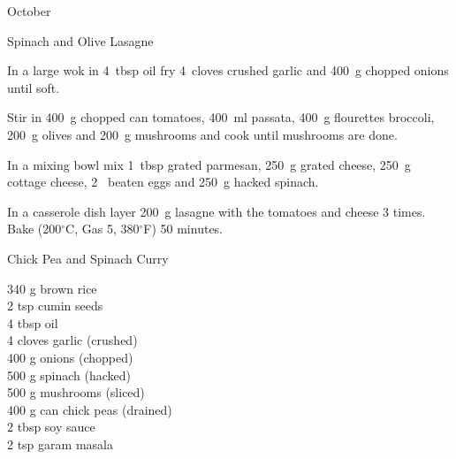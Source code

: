 \begin{menu}{October}
\begin{recipe}{2}{Spinach and Olive Lasagne}
	
	
    \begin{instructions}
    \item 
        In a large wok in
        4~tbsp  oil
        fry
        4~cloves crushed garlic
        and
        400~g chopped onions
        until soft.
      \item 
        Stir in
        400~g chopped can tomatoes,
        400~ml  passata,
        400~g flourettes broccoli,
        200~g  olives
        and
        200~g  mushrooms
        and cook until mushrooms are done.
      \item 
        In a mixing bowl mix
        1~tbsp grated parmesan,
        250~g grated cheese,
        250~g  cottage cheese,
        2~ beaten eggs
        and
        250~g hacked spinach.
      \item 
        In a casserole dish layer
        200~g  lasagne
        with the tomatoes and cheese 3 times.
        Bake (200$^{\circ}$C, Gas 5, 380$^{\circ}$F) 50 minutes.
      
    \end{instructions}
    \end{recipe}%
  
    \begin{recipe}{2}{Chick Pea and Spinach Curry}%
		\begin{ingredients}
		340 g brown rice  \\
	2 tsp cumin seeds  \\
	4 tbsp oil  \\
	4 cloves garlic (crushed) \\
	400 g onions (chopped) \\
	500 g spinach (hacked) \\
	500 g mushrooms (sliced) \\
	400 g can chick peas (drained) \\
	2 tbsp soy sauce  \\
	2 tsp garam masala  \\
	
		\end{ingredients}
	
	
	

\end{recipe}
\end{menu}
